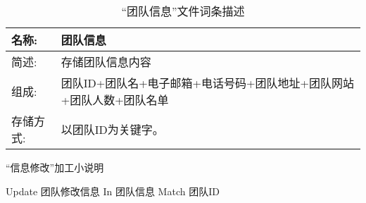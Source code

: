 \begin{table}[H]  
\caption{“团队信息”文件词条描述}  
\begin{center}  
    \begin{tabular}{l p{10cm}} 
        \hline
        \quad 名称:  &   团队信息 \\
        \hline
        \quad 简述:  & 存储团队信息内容\\
        \hline
        \quad 组成:  & 团队ID+团队名+电子邮箱+电话号码+团队地址+团队网站+团队人数+团队名单 \\
        \hline
        \quad 存储方式:  & 以团队ID为关键字。 \\
        \hline
    \end{tabular}
    \label{tab1}
\end{center}
\end{table}

\begin{algorithm}[H] 
    \renewcommand{\thealgorithm}{}
    \caption{“信息修改”加工小说明} 
    \label{alg3} 
    \begin{algorithmic}[1]
        \STATE Update 团队修改信息 In 团队信息 Match 团队ID
    \end{algorithmic} 
\end{algorithm}